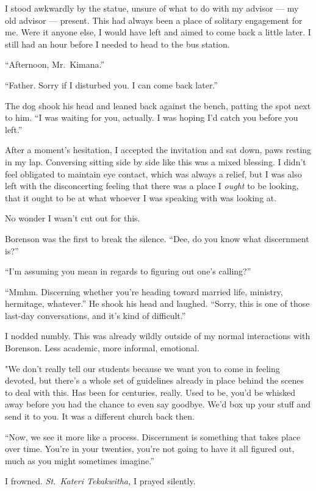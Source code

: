 I stood awkwardly by the statue, unsure of what to do with my advisor --- my old advisor --- present. This had always been a place of solitary engagement for me. Were it anyone else, I would have left and aimed to come back a little later. I still had an hour before I needed to head to the bus station.

``Afternoon, Mr.~Kimana.''

``Father. Sorry if I disturbed you. I can come back later.''

The dog shook his head and leaned back against the bench, patting the spot next to him. ``I was waiting for you, actually. I was hoping I'd catch you before you left.''

After a moment's hesitation, I accepted the invitation and sat down, paws resting in my lap. Conversing sitting side by side like this was a mixed blessing. I didn't feel obligated to maintain eye contact, which was always a relief, but I was also left with the disconcerting feeling that there was a place I \emph{ought} to be looking, that it ought to be at what whoever I was speaking with was looking at.

No wonder I wasn't cut out for this.

Borenson was the first to break the silence. ``Dee, do you know what discernment is?''

``I'm assuming you mean in regards to figuring out one's calling?''

``Mmhm. Discerning whether you're heading toward married life, ministry, hermitage, whatever.'' He shook his head and laughed. ``Sorry, this is one of those last-day conversations, and it's kind of difficult.''

I nodded numbly. This was already wildly outside of my normal interactions with Borenson. Less academic, more informal, emotional.

"We don't really tell our students because we want you to come in feeling devoted, but there's a whole set of guidelines already in place behind the scenes to deal with this. Has been for centuries, really. Used to be, you'd be whisked away before you had the chance to even say goodbye. We'd box up your stuff and send it to you. It was a different church back then.

``Now, we see it more like a process. Discernment is something that takes place over time. You're in your twenties, you're not going to have it all figured out, much as you might sometimes imagine.''

I frowned. \emph{St.~Kateri Tekakwitha,} I prayed silently.

